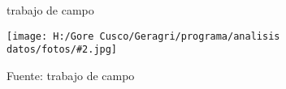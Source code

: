 \documentclass{article}\usepackage[]{graphicx}\usepackage[table]{xcolor}
\makeatletter
\newenvironment{kframe}{%
 \def\at@end@of@kframe{}%
 \ifinner\ifhmode%
  \def\at@end@of@kframe{\end{minipage}}%
  \begin{minipage}{\columnwidth}%
 \fi\fi%
 \def\FrameCommand##1{\hskip\@totalleftmargin \hskip-\fboxsep
 \colorbox{shadecolor}{##1}\hskip-\fboxsep
     \hskip-\linewidth \hskip-\@totalleftmargin \hskip\columnwidth}%
 \MakeFramed {\advance\hsize-\width
   \@totalleftmargin\z@ \linewidth\hsize
   \@setminipage}}%
 {\par\unskip\endMakeFramed%
 \at@end@of@kframe}
\newenvironment{knitrout}{}{} %
\newenvironment{tablas}[2]
{\begin{table}[H]
		\centering
		\caption{#1}
		#2
		\caption*{Fuente trabajo de campo}}
	{\end{table}}
\newenvironment{fotos}[2]
{\begin{figure}[H]
	\centering
	\caption{#1}
	\texttt{[image: H:/Gore Cusco/Geragri/programa/analisis datos/fotos/\#2.jpg]}
	\caption*{Fuente: trabajo de campo}}
{\end{figure}}
\newenvironment{graficas}[2]
{\begin{figure}[H]
		\centering
		\caption{#1}
		#2
		\caption*{Fuente trabajo de campo}}
{\end{figure}}
\makeatother
\begin{document}
\begin{fotos}
{trabajo de campo}{34}
\end{fotos}

\begin{comment}

\begin{tablas}
{Temas de capacitacion}{
\begin{kframe}


{\ttfamily\noindent\bfseries\color{errorcolor}{\#\# Error in setwd("{}H:/Gore Cusco/Geragri/programa/analisis datos/analisis2/programariego"{}): no es posible cambiar el directorio de trabajo}}

{\ttfamily\noindent\bfseries\color{errorcolor}{\#\# Error in file(file, "{}rt"{}): no se puede abrir la conexión}}

{\ttfamily\noindent\bfseries\color{errorcolor}{\#\# Error: objeto 'datos' no encontrado}}

{\ttfamily\noindent\bfseries\color{errorcolor}{\#\# Error: objeto 'datos' no encontrado}}

{\ttfamily\noindent\bfseries\color{errorcolor}{\#\# Error: objeto 'datos' no encontrado}}

{\ttfamily\noindent\bfseries\color{errorcolor}{\#\# Error: objeto 'datos' no encontrado}}

{\ttfamily\noindent\bfseries\color{errorcolor}{\#\# Error: objeto 'datos' no encontrado}}

{\ttfamily\noindent\bfseries\color{errorcolor}{\#\# Error: objeto 'datos' no encontrado}}

{\ttfamily\noindent\bfseries\color{errorcolor}{\#\# Error: objeto 'datos' no encontrado}}

{\ttfamily\noindent\bfseries\color{errorcolor}{\#\# Error: objeto 'datos' no encontrado}}

{\ttfamily\noindent\bfseries\color{errorcolor}{\#\# Error: objeto 'datos' no encontrado}}

{\ttfamily\noindent\bfseries\color{errorcolor}{\#\# Error: objeto 'datos' no encontrado}}\end{kframe}
}
\end{tablas}

\begin{graficas}
{Temas de capacitacion}{
\begin{knitrout}
\definecolor{shadecolor}{rgb}{0.969, 0.969, 0.969}\color{fgcolor}\begin{kframe}


{\ttfamily\noindent\bfseries\color{errorcolor}{\#\# Error in setwd("{}H:/Gore Cusco/Geragri/programa/analisis datos/analisis2/programariego"{}): no es posible cambiar el directorio de trabajo}}


\end{comment}
\end{document}
